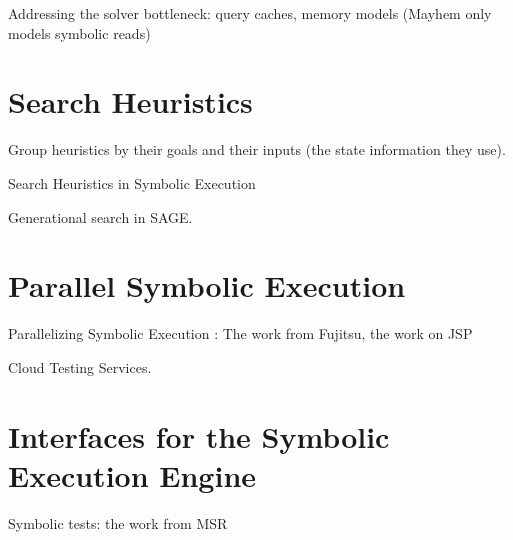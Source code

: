 Addressing the solver bottleneck: query caches, memory models (Mayhem only models symbolic reads)


\section{Search Heuristics}
\label{sec:relwork:heuristics}

Group heuristics by their goals and their inputs (the state information they use).

Search Heuristics in Symbolic Execution

Generational search in SAGE.


\section{Parallel Symbolic Execution}
\label{sec:relwork:parallel}

Parallelizing Symbolic Execution : The work from Fujitsu, the work on JSP

Cloud Testing Services.


\section{Interfaces for the Symbolic Execution Engine}
\label{sec:relwork:ifaces}

Symbolic tests: the work from MSR


